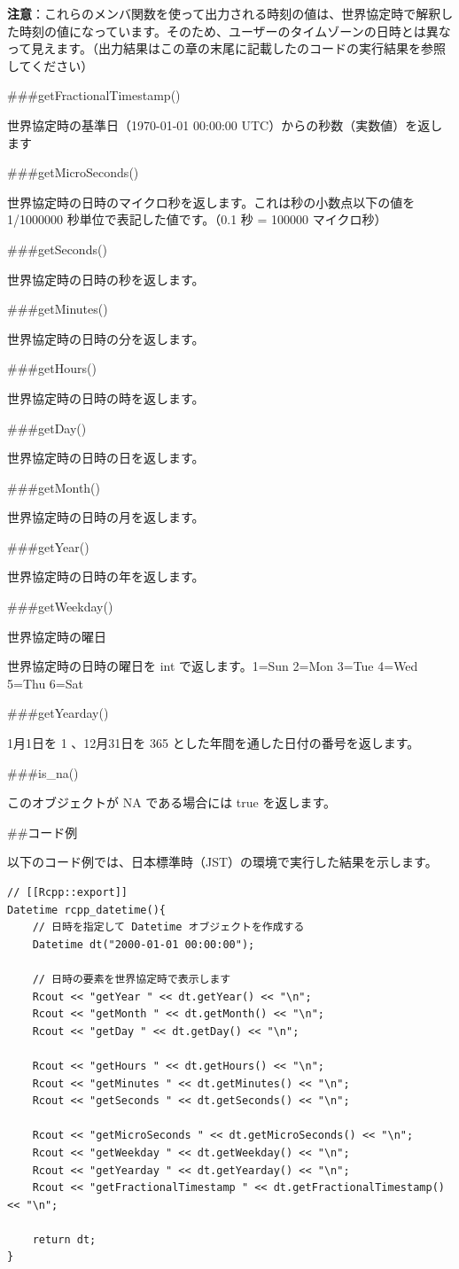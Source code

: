 \documentclass[]{book}
\begin{document}
\textbf{注意}：これらのメンバ関数を使って出力される時刻の値は、世界協定時で解釈した時刻の値になっています。そのため、ユーザーのタイムゾーンの日時とは異なって見えます。（出力結果はこの章の末尾に記載したのコードの実行結果を参照してください）

\#\#\#getFractionalTimestamp()

世界協定時の基準日（1970-01-01 00:00:00 UTC）からの秒数（実数値）を返します

\#\#\#getMicroSeconds()

世界協定時の日時のマイクロ秒を返します。これは秒の小数点以下の値を 1/1000000 秒単位で表記した値です。（0.1 秒 = 100000 マイクロ秒）

\#\#\#getSeconds()

世界協定時の日時の秒を返します。

\#\#\#getMinutes()

世界協定時の日時の分を返します。

\#\#\#getHours()

世界協定時の日時の時を返します。

\#\#\#getDay()

世界協定時の日時の日を返します。

\#\#\#getMonth()

世界協定時の日時の月を返します。

\#\#\#getYear()

世界協定時の日時の年を返します。

\#\#\#getWeekday()

世界協定時の曜日

世界協定時の日時の曜日を int で返します。1=Sun 2=Mon 3=Tue 4=Wed 5=Thu 6=Sat

\#\#\#getYearday()

1月1日を 1 、12月31日を 365 とした年間を通した日付の番号を返します。

\#\#\#is\_na()

このオブジェクトが NA である場合には true を返します。

\#\#コード例

以下のコード例では、日本標準時（JST）の環境で実行した結果を示します。

\begin{verbatim}
// [[Rcpp::export]]
Datetime rcpp_datetime(){
    // 日時を指定して Datetime オブジェクトを作成する
    Datetime dt("2000-01-01 00:00:00");

    // 日時の要素を世界協定時で表示します
    Rcout << "getYear " << dt.getYear() << "\n";
    Rcout << "getMonth " << dt.getMonth() << "\n";
    Rcout << "getDay " << dt.getDay() << "\n";

    Rcout << "getHours " << dt.getHours() << "\n";
    Rcout << "getMinutes " << dt.getMinutes() << "\n";
    Rcout << "getSeconds " << dt.getSeconds() << "\n";

    Rcout << "getMicroSeconds " << dt.getMicroSeconds() << "\n";
    Rcout << "getWeekday " << dt.getWeekday() << "\n";
    Rcout << "getYearday " << dt.getYearday() << "\n";
    Rcout << "getFractionalTimestamp " << dt.getFractionalTimestamp() << "\n";

    return dt;
}
\end{verbatim}
\end{document}
